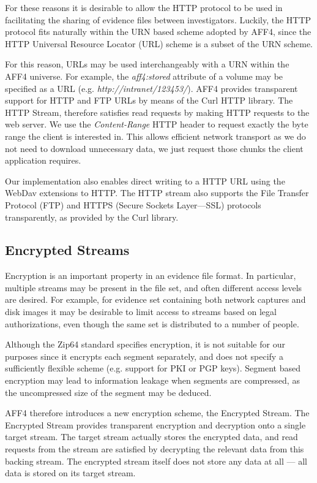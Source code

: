 \documentclass[10pt, conference]{IEEEtran}
\begin{document}
For these reasons it is desirable to allow the HTTP protocol to be
used in facilitating the sharing of evidence files between
investigators. Luckily, the HTTP protocol fits naturally within the
URN based scheme adopted by AFF4, since the HTTP Universal Resource
Locator (URL) scheme is a subset of the URN scheme.

For this reason, URLs may be used interchangeably with a URN within
the AFF4 universe. For example, the \emph{aff4:stored} attribute of a
volume may be specified as a URL
(e.g. \emph{http://intranet/123453/}).  AFF4 provides transparent
support for HTTP and FTP URLs by means of the Curl HTTP
library\cite{libcurl}. The HTTP Stream, therefore satisfies read
requests by making HTTP requests to the web server. We use the
\emph{Content-Range} HTTP header to request exactly the byte range the
client is interested in. This allows efficient network transport as we
do not need to download unnecessary data, we just request those chunks
the client application requires.

Our implementation also enables direct writing to a HTTP URL using the
WebDav extensions to HTTP\cite{webdav-rfc}. The HTTP stream also
supports the File Transfer Protocol (FTP) and HTTPS (Secure Sockets
Layer---SSL) protocols transparently, as provided by the Curl library.

\subsection{Encrypted Streams}
\label{crypted_stream}
Encryption is an important property in an evidence file format. In
particular, multiple streams may be present in the file set, and often
different access levels are desired. For example, for evidence set
containing both network captures and disk images it may be desirable
to limit access to streams based on legal authorizations, even though
the same set is distributed to a number of people.

Although the Zip64 standard specifies encryption, it is not suitable
for our purposes since it encrypts each segment separately, and does
not specify a sufficiently flexible scheme (e.g. support for PKI or
PGP keys). Segment based encryption may lead to information leakage
when segments are compressed, as the uncompressed size of the segment
may be deduced.

AFF4 therefore introduces a new encryption scheme, the Encrypted
Stream.  The Encrypted Stream provides transparent encryption and
decryption onto a single target stream. The target stream actually
stores the encrypted data, and read requests from the stream are
satisfied by decrypting the relevant data from this backing
stream. The encrypted stream itself does not store any data at all ---
all data is stored on its target stream.
\end{document}
